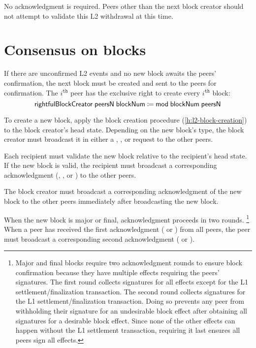 \documentclass[../hydrozoa.tex]{subfiles}
\begin{document}
No acknowledgment is required.
Peers other than the next block creator should not attempt to validate this L2 withdrawal at this time.

\section{Consensus on blocks}%
\label{h:l2-consensus-on-blocks}%

If there are unconfirmed L2 events and no new block awaits the peers' confirmation, the next block must be created and sent to the peers for confirmation.
The $i^\mathtt{th}$ peer has the exclusive right to create every $i^\mathtt{th}$ block: 
\begin{equation*}
  \mathsf{rightfulBlockCreator} \; \mathsf{peersN} \; \mathsf{blockNum} \coloneq
    \mathsf{mod} \; \mathsf{blockNum} \; \mathsf{peersN}
\end{equation*}

To create a new block, apply the block creation procedure (\cref{h:l2-block-creation}) to the block creator's head state.
Depending on the new block's type, the block creator must broadcast it in either a , , or  request to the other peers.

Each recipient must validate the new block relative to the recipient's head state.
If the new block is valid, the recipient must broadcast a corresponding acknowledgment (, , or ) to the other peers.

The block creator must broadcast a corresponding acknowledgment of the new block to the other peers immediately after broadcasting the new block.

When the new block is major or final, acknowledgment proceeds in two rounds.%
\footnote{Major and final blocks require two acknowledgment rounds to ensure block confirmation because they have multiple effects requiring the peers' signatures.
  The first round collects signatures for all effects except for the L1 settlement/finalization transaction.
  The second round collects signatures for the L1 settlement/finalization transaction.
  Doing so prevents any peer from withholding their signature for an undesirable block effect after obtaining all signatures for a desirable block effect.
  Since none of the other effects can happen without the L1 settlement transaction, requiring it last ensures all peers sign all effects.
  }
When a peer has received the first acknowledgment ( or ) from all peers, the peer must broadcast a corresponding second acknowledgment ( or ).
\end{document}
